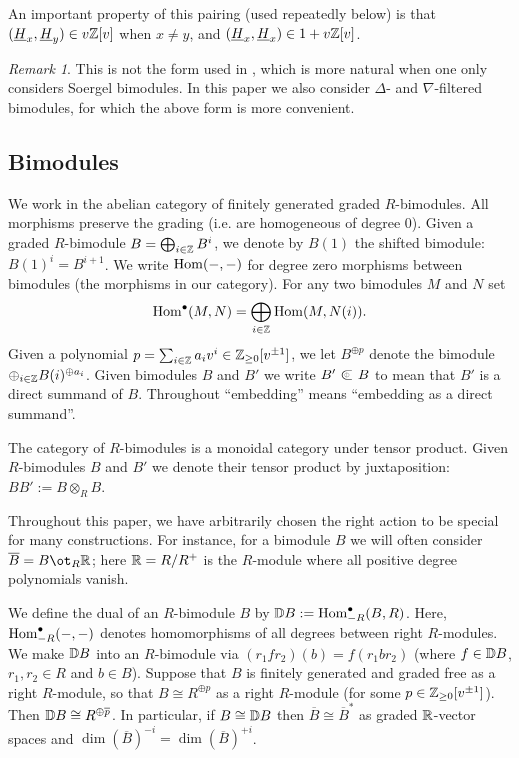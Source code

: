 \documentclass[11pt]{amsart}
\numberwithin{equation}{section}
\def\ov{\overline}
\def\un{\underline}
\def\to{\rightarrow}
\def\summand{
\mathbin{\tikz [baseline=-3pt]
{
\clip (-0.2,-0.15) rectangle (0.2,0.15);
\node[scale=1.2] at (0,0) {$\subset$}; \node[scale=0.5] at
  (0,0) {$\oplus$}; }}
}
\theoremstyle{definition}
\theoremstyle{remark}
\newtheorem{remark}[thm]{Remark}
\begin{document}
An important property of this pairing (used repeatedly below) is that $(\un{H}_x,\un{H}_y) \in v \ZM[v]$ when $x \ne y$, and $(\un{H}_x,\un{H}_x) \in 1 + v \ZM[v]$.

\begin{remark} This is not the form used in \cite{EW2}, which is more natural when one only considers Soergel bimodules. In this paper we also consider $\Delta$- and $\nabla$-filtered
bimodules, for which the above form is more convenient. \end{remark}

\subsection{Bimodules}

We work in the abelian category of finitely generated graded $R$-bimodules. All morphisms
preserve the grading (i.e. are homogeneous of degree 0). Given a graded $R$-bimodule $B = \bigoplus_{i \in {\mathbb{Z}}} B^i$, we denote by $B(1)$ the shifted bimodule: $B(1)^i =
B^{i+1}$. We write $\operatorname{Hom}(-,-)$ for degree zero morphisms between
bimodules (the morphisms in our category). For any two bimodules $M$ and $N$ set \[ \operatorname{Hom}^{\bullet}(M,N) = \bigoplus_{i \in {\mathbb{Z}}}\operatorname{Hom}(M, N(i)). \] Given a
polynomial $p = \sum_{i \in {\mathbb{Z}}} a_i v^i \in {\mathbb{Z}}_{\ge 0}[v^{\pm 1}]$,
we let $B^{\oplus p}$ denote the bimodule $\oplus_{i \in {\mathbb{Z}}}
B(i)^{\oplus a_i}$. Given bimodules $B$ and $B'$ we write $B' \summand
B$ to mean that $B'$ is a direct summand of $B$.  Throughout ``embedding'' means
``embedding as a direct summand''.

The category of $R$-bimodules is a monoidal category under tensor
product. Given $R$-bimodules $B$ and $B'$ we denote their tensor product by
juxtaposition: $BB' := B \otimes_R B$.

Throughout this paper, we have arbitrarily chosen the right action to be special for many constructions. For instance, for a bimodule $B$ we will often consider $\ov{B} = B \ot_R \RM$;
here ${\mathbb{R}} = R/R^+$ is the $R$-module where all positive degree polynomials vanish.

We define the dual of an $R$-bimodule $B$ by $ {\mathbb{D}} B :=
\operatorname{Hom}^\bullet_{-R}(B, R)$. Here, $\operatorname{Hom}^\bullet_{-R}(-,-)$ denotes
homomorphisms of all degrees between right $R$-modules. We make ${\mathbb{D}} B$ 
into an $R$-bimodule via $(r_1fr_2)(b) = f(r_1br_2)$ (where $f \in
{\mathbb{D}} B$, $r_1, r_2 \in R$ and $b \in B$). Suppose that $B$ is
finitely generated and graded free as a right $R$-module, so that $B
\cong R^{\oplus p}$ as a
right $R$-module (for some $p \in {\mathbb{Z}}_{\ge 0}[v^{\pm 1}]$). Then ${\mathbb{D}} B \cong R^{\oplus
  \overline{p}}$. In particular, if $B \cong {\mathbb{D}} B$ then $\overline{B}
\cong \overline{B}^*$ as graded ${\mathbb{R}}$-vector spaces and $\dim
(\ov{B})^{-i} = \dim (\ov{B})^{+i}$.
\end{document}
